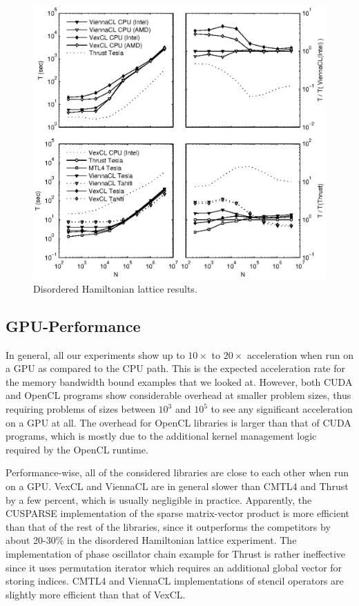 \documentclass[final]{siamltex}
\begin{document}
\begin{figure}
    \begin{center}
        \includegraphics[width=\textwidth]{data/disordered_ham_lattice/perfmtx}
    \end{center}
    \caption{Disordered Hamiltonian lattice results.}
    \label{fig:lattice:perf}
\end{figure}

\subsection{GPU-Performance}
In general, all our experiments show up to $10\times$ to $20\times$
acceleration when run on a GPU as compared to the CPU path. This is the
expected acceleration rate for the memory bandwidth bound examples that we
looked at. However, both CUDA and OpenCL programs show considerable overhead
at smaller problem sizes, thus requiring problems of sizes between $10^3$
and $10^5$ to see any significant acceleration on a GPU at all. The overhead
for OpenCL libraries is larger than that of CUDA programs, which is mostly due
to the additional kernel management logic required by the OpenCL runtime.

Performance-wise, all of the considered libraries are close to each other when
run on a GPU.  VexCL and ViennaCL are in general slower than CMTL4 and Thrust
by a few percent, which is usually negligible in practice.  Apparently, the
CUSPARSE implementation of the sparse matrix-vector product is more efficient
than that of the rest of the libraries, since it outperforms the competitors by
about 20-30\% in the disordered Hamiltonian lattice experiment.  The
implementation of phase oscillator chain example for Thrust is rather
ineffective since it uses permutation iterator which requires an additional
global vector for storing indices. CMTL4 and ViennaCL implementations of
stencil operators are slightly more efficient than that of VexCL.
\end{document}

